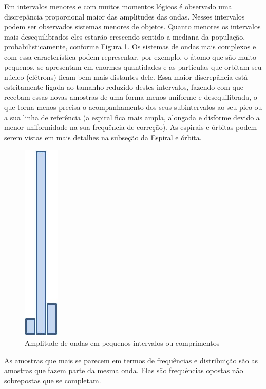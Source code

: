 Em intervalos menores e com muitos momentos lógicos é observado uma discrepância proporcional maior das amplitudes das ondas. Nesses intervalos podem ser observados sistemas menores de objetos. Quanto menores os intervalos mais desequilibrados eles estarão crescendo sentido a mediana da população, probabilisticamente, conforme Figura \ref{fig:consciousness_space_subconsciousness_min}. Os sistemas de ondas mais complexos e com essa característica podem representar, por exemplo, o átomo que são muito pequenos, se apresentam em enormes quantidades e as partículas que orbitam seu núcleo (elétrons) ficam bem mais distantes dele. Essa maior discrepância está estritamente ligada ao tamanho reduzido destes intervalos, fazendo com que recebam essas novas amostras de uma forma menos uniforme e desequilibrada, o que torna menos precisa o acompanhamento dos seus subintervalos ao seu pico ou a sua linha de referência (a espiral fica mais ampla, alongada e disforme devido a menor uniformidade na sua frequência de correção). As espirais e órbitas podem serem vistas em mais detalhes na subseção da Espiral e órbita.
	\begin{figure}[H]
	\caption{Amplitude de ondas em pequenos intervalos ou comprimentos}
	\label{fig:consciousness_space_subconsciousness_min}
	\centering
	\includegraphics[scale=.45]{sections/images/consciousness_space_subconsciousness_min.jpg}
	\end{figure}

As amostras que mais se parecem em termos de frequências e distribuição são as amostras que fazem parte da mesma onda. Elas são frequências opostas não sobrepostas que se completam.

